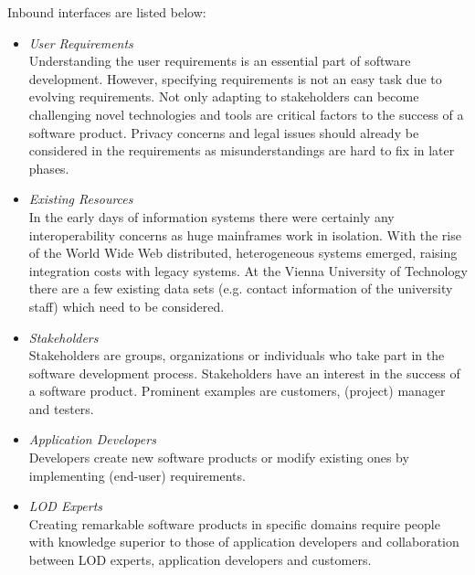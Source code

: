 \documentclass{article}
\begin{document}
Inbound interfaces are listed below:
\begin{itemize}
	\item \textit{User Requirements}~\\
	Understanding the user requirements is an essential part of software development. However, specifying requirements is not an easy task due to evolving requirements. Not only adapting to stakeholders can become challenging novel technologies and tools are critical factors to the success of a software product. Privacy concerns and legal issues should already be considered in the requirements as misunderstandings are hard to fix in later phases. 
	\item \textit{Existing Resources}~\\
	In the early days of information systems there were certainly any interoperability concerns as huge mainframes work in isolation. With the rise of the World Wide Web distributed, heterogeneous systems emerged, raising integration costs with legacy systems. At the Vienna University of Technology there are a few existing data sets (e.g. contact information of the university staff) which need to be considered. 
	\item \textit{Stakeholders}~\\
	Stakeholders are groups, organizations or individuals who take part in the software development process. Stakeholders have an interest in the success of a software product. Prominent examples are customers, (project) manager and testers. 
	\item \textit{Application Developers}~\\
	Developers create new software products or modify existing ones by implementing (end-user) requirements. 
	\item \textit{LOD Experts}~\\
	Creating remarkable software products in specific domains require people with knowledge superior to those of application developers and collaboration between LOD experts, application developers and customers.
\end{itemize}
\end{document}
